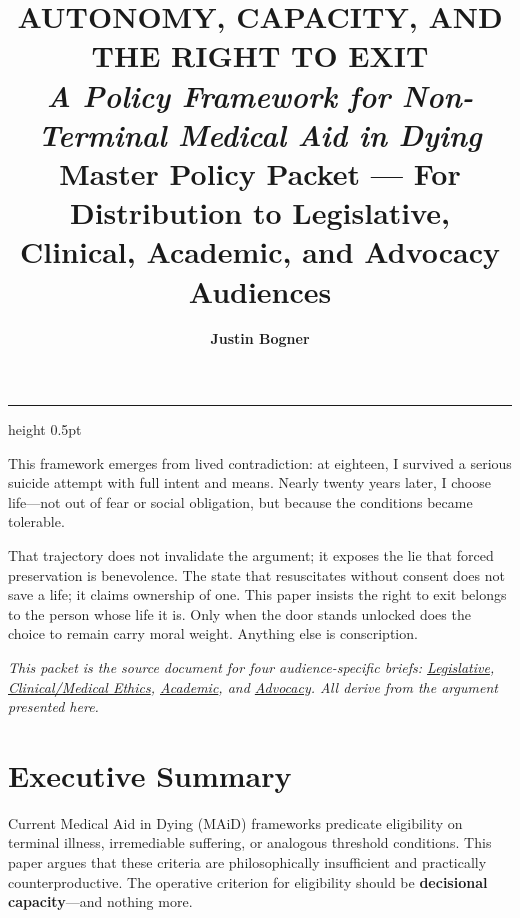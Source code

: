 \documentclass[11pt, letterpaper]{article}
\title{%
  {\sffamily\LARGE\bfseries\color{accent}
    AUTONOMY, CAPACITY, AND THE RIGHT TO EXIT}\\[0.6em]
  {\large\itshape A Policy Framework for Non-Terminal Medical Aid in Dying}\\[0.4em]
  {\normalsize\sffamily\color{midgray} Master Policy Packet — For Distribution to Legislative,
    Clinical, Academic, and Advocacy Audiences}
}
\author{\sffamily\bfseries Justin Bogner}
\date{\sffamily 2026}
\begin{document}

\maketitle
\thispagestyle{empty}

\vspace{0.5em}
{\color{rulegray}\hrule height 0.5pt}
\vspace{1.2em}

\begin{tcolorbox}[policybox, title={\sffamily\bfseries\small\color{accent} Author's Note}]
This framework emerges from lived contradiction: at eighteen, I survived a serious suicide
attempt with full intent and means. Nearly twenty years later, I choose life---not out of
fear or social obligation, but because the conditions became tolerable.

\medskip
That trajectory does not invalidate the argument; it exposes the lie that forced preservation
is benevolence. The state that resuscitates without consent does not save a life; it claims
ownership of one. This paper insists the right to exit belongs to the person whose life it
is. Only when the door stands unlocked does the choice to remain carry moral weight. Anything
else is conscription.

\medskip
\textit{This packet is the source document for four audience-specific briefs: \href{01_legislative_brief.pdf}{Legislative},
\href{04_clinical_brief.pdf}{Clinical/Medical Ethics}, \href{03_academic_paper.pdf}{Academic}, and \href{02_advocacy_brief.pdf}{Advocacy}. All derive from the argument presented here.}
\end{tcolorbox}

\vspace{1em}

{
\hypersetup{hidelinks}
\tableofcontents
}

\newpage

\section*{Executive Summary}

Current Medical Aid in Dying (MAiD) frameworks predicate eligibility on terminal illness,
irremediable suffering, or analogous threshold conditions. This paper argues that these
criteria are philosophically insufficient and practically counterproductive. The operative
criterion for eligibility should be \textbf{decisional capacity}---and nothing more.
\end{document}
